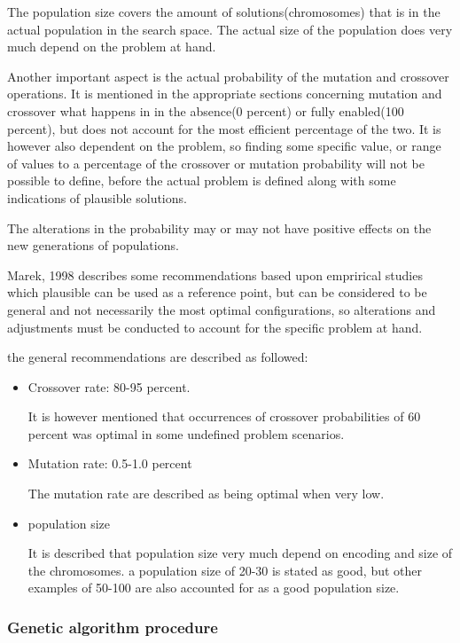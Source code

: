 The population size covers the amount of solutions(chromosomes) that is in the actual population in the search space. The actual size of the population does very much depend on the problem at hand.\cite[pp. 42]{Sivanandam2008}


Another important aspect is the actual probability of the mutation and crossover operations.
It is mentioned in the appropriate sections concerning mutation and crossover what happens in in the absence(0 percent) or fully enabled(100 percent), but does not account for the most efficient percentage of the two. It is however also dependent on the problem, so finding some specific value, or range of values to a percentage of the crossover or mutation probability will not be possible to define, before the actual problem is defined along with some indications of plausible solutions.

The alterations in the probability may or may not have positive effects on the new generations of populations.

Marek, 1998\cite{Marek1998}  describes some recommendations based upon emprirical studies which plausible can be used as a reference point, but can be considered to be general and not necessarily the most optimal configurations, so alterations and adjustments must be conducted to account for the specific problem at hand.

the general recommendations are described as followed:
\begin{itemize}
\item Crossover rate: 80-95 percent.

It is however mentioned that occurrences of crossover probabilities of 60 percent was optimal in some undefined problem scenarios.
\item Mutation rate: 0.5-1.0 percent

The mutation rate are described as being optimal when very low.
\item population size

It is described that population size very much depend on encoding and size of the chromosomes. a population size of 20-30 is stated as good, but other examples of 50-100 are also accounted for as a good population size.
\end{itemize}

\subsubsection{Genetic algorithm procedure}


